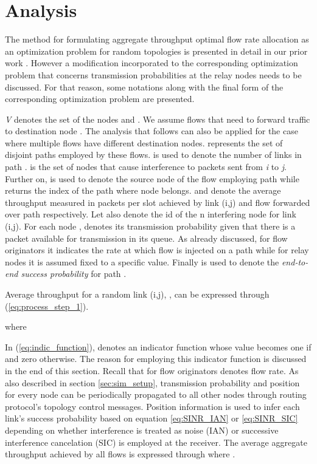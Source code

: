 \documentclass[conference]{IEEEtran}
\begin{document}
\section{Analysis}
\label{sec:analysis}

The method for formulating aggregate throughput optimal flow rate allocation as an optimization problem for random topologies is presented in detail
in our prior work \cite{6824997, DBLP:journals/corr/PloumidisPT14}. However a modification incorporated to the corresponding optimization problem
that concerns transmission probabilities at the relay nodes needs to be discussed. For that reason, some notations along with the
final form of the corresponding optimization problem are presented.

\textit{V} denotes the set of the nodes and .
We assume  flows  that need to forward traffic to destination node .
The analysis that follows can also be applied for the case where multiple flows have different destination nodes.
 represents the set of  disjoint paths employed by these flows.
 is used to denote the number of links in path .
 is the set of nodes that cause interference to packets sent from \textit{i} to \textit{j}.
Further on,  is used to denote the source node of the  flow employing path 
while  returns the index of the path where node  belongs.
 and  denote the average throughput measured in packets per slot achieved by link (i,j) and flow 
forwarded over path  respectively.
Let also  denote the id of the n interfering node for link (i,j).
For each node ,  denotes its transmission probability given that there is a packet
available for transmission in its queue. As already discussed, for flow originators it indicates the rate at
which flow is injected on a path while for relay nodes it is assumed fixed to a specific value.
Finally  is used to denote the \textit{end-to-end success probability} for path .

Average throughput for a random link (i,j), , can be expressed through (\ref{eq:process_step_1}).
\vspace{-0.094in}

where




In (\ref{eq:indic_function}),  denotes an indicator function whose value becomes one if  and zero otherwise.
The reason for employing this indicator function is discussed in the end of this section.
Recall that for flow originators  denotes flow rate.
As also described in section \ref{sec:sim_setup}, transmission probability and position for every node can be periodically propagated to all other nodes
through routing protocol's topology control messages.
Position information is used to infer each link's success probability based on equation \ref{eq:SINR_IAN} or \ref{eq:SINR_SIC} depending on whether interference
is treated as noise (IAN) or successive interference cancelation (SIC) is employed at the receiver.
The average aggregate throughput achieved by all flows is expressed through 
where .
\end{document}
